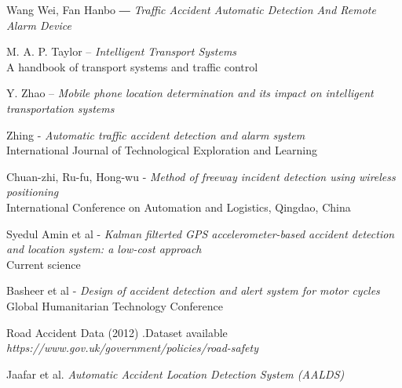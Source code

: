 \documentclass[a4paper,oneside,14pt]{memoir}
\begin{document}
\frontmatter
\thetitlepage
\aucertificate
\auacknowledge
\auabstract

%
\tableofcontents*
\listoffigures
\listoftables
{}

\mainmatter
\pagestyle{au}
\auSpacing  %


\appendix

\backmatter
\begin{thebibliography}{1}

Wang Wei, Fan Hanbo ― \emph{Traffic Accident Automatic Detection And Remote Alarm Device}

M. A. P. Taylor – \emph{Intelligent Transport Systems} \\
A handbook of transport systems and traffic control

Y. Zhao – \emph{Mobile phone location determination and its impact on intelligent transportation systems}

Zhing - \emph{Automatic traffic accident detection and alarm system} \\
International Journal of Technological Exploration and Learning 

Chuan-zhi, Ru-fu, Hong-wu - \emph{Method of freeway incident detection using wireless positioning} \\
International Conference on Automation and Logistics, Qingdao, China

Syedul Amin et al - \emph{Kalman filterted GPS accelerometer-based accident detection and location system: a low-cost approach} \\
Current science

Basheer et al - \emph{Design of accident detection and alert system for motor cycles} \\ 
Global Humanitarian Technology Conference

Road Accident Data (2012) .Dataset available \\ \textit{https://www.gov.uk/government/policies/road-safety}

Jaafar et al. \emph{Automatic Accident Location Detection System (AALDS)} 

\end{thebibliography}
\end{document}

